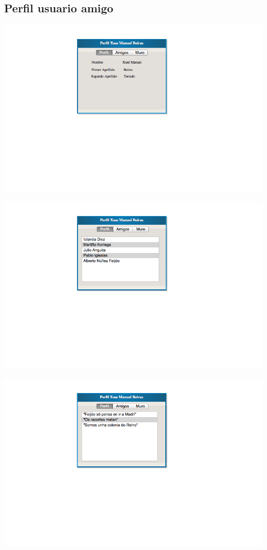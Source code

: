 \documentclass[12pt, a4paper, titlepage]{article}
\begin{document}
\subsection{Perfil usuario amigo}

\begin{center}
	\includegraphics[scale=0.7]{Imagenes/perfil_amigo}
\end{center}

\begin{center}
	\includegraphics[scale=0.7]{Imagenes/perfil_amigo_amigos}
\end{center}

\begin{center}
	\includegraphics[scale=0.7]{Imagenes/perfil_amigo_muro}
\end{center}
\end{document}
